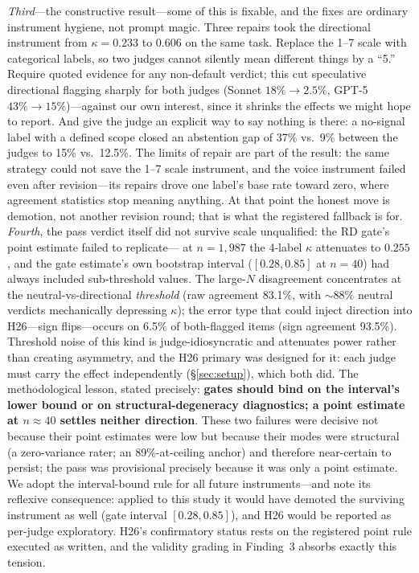 \documentclass{article}
\newcommand{\kap}{\kappa}
\begin{document}
\emph{Third}---the constructive result---some of this is fixable, and
the fixes are ordinary instrument hygiene, not prompt magic. Three
repairs took the directional instrument from $\kap = 0.233$ to $0.606$
on the same task. Replace the 1--7 scale with categorical labels, so
two judges cannot silently mean different things by a ``5.'' Require
quoted evidence for any non-default verdict; this cut speculative
directional flagging sharply for both judges (Sonnet $18\%\to2.5\%$,
GPT-5 $43\%\to15\%$)---against our own interest, since it shrinks the
effects we might hope to report. And give the judge an explicit way to
say nothing is there: a no-signal label with a defined scope closed an
abstention gap of 37\% vs.\ 9\% between the judges to 15\% vs.\
12.5\%. The limits of repair are part of the result: the same strategy
could not save the 1--7 scale instrument, and the voice instrument
failed even after revision---its repairs drove one label's base rate
toward zero, where agreement statistics stop meaning anything. At that
point the honest move is demotion, not another revision round; that is
what the registered fallback is for. \emph{Fourth}, the pass verdict itself did not survive scale
unqualified: the RD gate's point estimate failed to replicate--- at $n{=}1{,}987$ the 4-label $\kap$ attenuates to $0.255$, and
the gate estimate's own bootstrap interval ($[0.28, 0.85]$ at $n{=}40$)
had always included sub-threshold values. The large-$N$ disagreement
concentrates at the neutral-vs-directional \emph{threshold} (raw
agreement 83.1\%, with ${\sim}88\%$ neutral verdicts mechanically
depressing $\kap$); the error type that could inject direction into
H26---sign flips---occurs on 6.5\% of both-flagged items (sign agreement
93.5\%). Threshold noise of this kind is judge-idiosyncratic and
attenuates power rather than creating asymmetry, and the H26 primary was
designed for it: each judge must carry the effect independently
(\S\ref{sec:setup}), which both did. The methodological lesson, stated precisely: \textbf{gates should bind
on the interval's lower bound or on structural-degeneracy diagnostics; a
point estimate at $n{\approx}40$ settles neither direction}. These two
failures were decisive not because their point estimates were low but
because their modes were structural (a zero-variance rater; an
89\%-at-ceiling anchor) and therefore near-certain to persist; the pass
was provisional precisely because it was only a point estimate. We adopt
the interval-bound rule for all future instruments---and note its
reflexive consequence: applied to this study it would have demoted the
surviving instrument as well (gate interval $[0.28, 0.85]$), and H26
would be reported as per-judge exploratory. H26's confirmatory status
rests on the registered point rule executed as written, and the validity
grading in Finding~3 absorbs exactly this tension.
\end{document}
